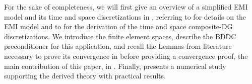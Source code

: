 For the sake of completeness, we will first give an overview of a simplified EMI model and its time and space discretizations in , referring to \cite{EMI-1, EMI-4, EMI-5} for details on the EMI model and to \cite{2D-proof} for the derivation of the time and space composite-DG discretizations. We introduce the finite element spaces, describe the BDDC preconditioner for this application, and recall the Lemmas from literature necessary to prove its convergence in  before providing a convergence proof, the main contribution of this paper, in . Finally,  presents a numerical study supporting the derived theory with practical results.

